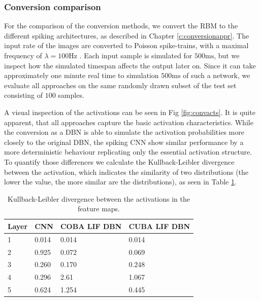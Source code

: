 \subsubsection{Conversion comparison} \label{c:conversioncomp}

For the comparison of the conversion methods, we convert the RBM to the different spiking architectures, as described in Chapter \ref{c:conversionappr}. 
The input rate of the images are converted to Poisson spike-trains, with a maximal frequency of $\lambda = 100 \text{Hz}$ .
Each input sample is simulated for $500 \text{ms}$, but we inspect how the simulated timespan affects the output later on.
Since it can take approximately one minute real time to simulation $500 \text{ms}$ of such a network, we evaluate all approaches on the same randomly drawn subset of the test set consisting of $100$ samples.

A visual inspection of the activations can be seen in Fig \ref{fig:convacts}. 
It is quite apparent, that all approaches capture the basic activation characteristics. 
While the conversion as a DBN is able to simulate the activation probabilities more closely to the original DBN, the spiking CNN show similar performance by a more deterministic behaviour replicating only the essential activation structure.
To quantify those differences we calculate the Kullback-Leibler divergence between the activation, which indicates the similarity of two distributions (the lower the value, the more similar are the distributions), as seen in Table \ref{tab:kldiv}.



\begin{table}[]
\centering
\caption{Kullback-Leibler divergence between the activations in the feature maps.}
\label{tab:kldiv}
\begin{tabular}{|l|l|l|l|}
\hline
Layer & CNN   & COBA LIF DBN & CUBA LIF DBN \\ \hline
1     & 0.014 & 0.014        & 0.014        \\
2     & 0.925 & 0.072        & 0.069        \\
3     & 0.260 & 0.170        & 0.248        \\
4     & 0.296 & 2.61         & 1.067        \\
5     & 0.624 & 1.254        & 0.445        \\ \hline
\end{tabular}
\end{table}


